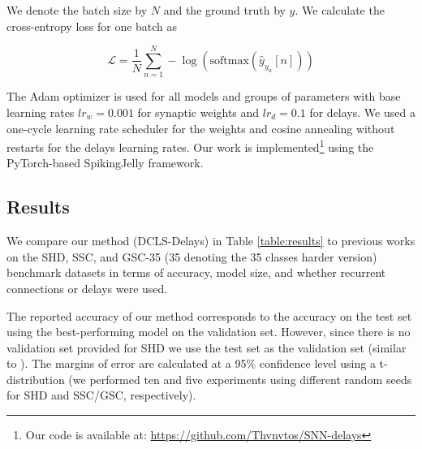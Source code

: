 \documentclass{article} \usepackage{iclr2024_conference,times}
\begin{document}
We denote the batch size by $N$ and the ground truth by $y$. We calculate the cross-entropy loss for one batch as

\begin{equation}
\mathcal{L}= \frac{1}{N} \sum_{n=1}^{N} -\log(\text{softmax}(\hat{y}_{y_n}[n]))
\end{equation}




The Adam optimizer \citep{adam} is used for all models and groups of parameters with base learning rates $lr_{w} = 0.001$ for synaptic weights and $lr_{d} = 0.1$  for delays. We used a one-cycle learning rate scheduler \citep{one_cycle} for the weights and cosine annealing \citep{cosine_annealing} without restarts for the delays learning rates.
Our work is implemented\footnote{Our code is available at: \url{https://github.com/Thvnvtos/SNN-delays} 
} using the PyTorch-based SpikingJelly\citep{SpikingJelly,Fang2023a} framework.

\subsection{Results}

We compare our method (DCLS-Delays) in Table \ref{table:results} to previous works on the SHD, SSC, and GSC-35 (35 denoting the 35 classes harder version) benchmark datasets in terms of accuracy, model size, and whether recurrent connections or delays were used.

The reported accuracy of our method corresponds to the accuracy on the test set using the best-performing model on the validation set. However, since there is no validation set provided for SHD we use the test set as the validation set (similar to \citet{baseline}). The margins of error are calculated at a 95\% confidence level using a t-distribution (we performed ten and five experiments using different random seeds for SHD and SSC/GSC, respectively).
\end{document}
